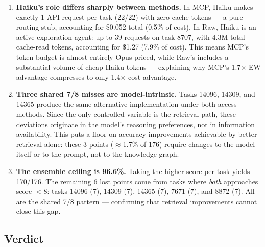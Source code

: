 \begin{enumerate}
\item \textbf{Haiku's role differs sharply between methods.}
      In MCP, Haiku makes exactly 1 API request per task (22/22) with
      zero cache tokens --- a pure routing stub, accounting for
      \$0.052 total (0.5\% of cost).
      In Raw, Haiku is an active exploration agent: up to 39 requests
      on task 8707, with 4.3M total cache-read tokens, accounting for
      \$1.27 (7.9\% of cost).
      This means MCP's token budget is almost entirely Opus-priced,
      while Raw's includes a substantial volume of cheap Haiku tokens
      --- explaining why MCP's 1.7$\times$ EW advantage compresses to
      only 1.4$\times$ cost advantage.

\item \textbf{Three shared 7/8 misses are model-intrinsic.}
      Tasks 14096, 14309, and 14365 produce the same alternative
      implementation under both access methods.  Since the only
      controlled variable is the retrieval path, these deviations
      originate in the model's reasoning preferences, not in
      information availability.  This puts a floor on accuracy
      improvements achievable by better retrieval alone: these 3
      points ($\approx$1.7\% of 176) require changes to the model
      itself or to the prompt, not to the knowledge graph.

\item \textbf{The ensemble ceiling is 96.6\%.}
      Taking the higher score per task yields 170/176.  The
      remaining 6 lost points come from tasks where \emph{both}
      approaches score $<$8: tasks 14096 (7), 14309 (7), 14365 (7),
      7671 (7), and 8872 (7).  All are the shared 7/8 pattern ---
      confirming that retrieval improvements cannot close this gap.

\end{enumerate}

\subsection{Verdict}\label{sec:verdict}


